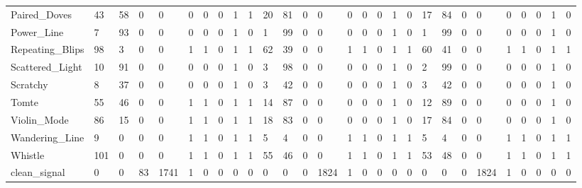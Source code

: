 \begin{tabular}{lllllrrlrrllllrrlllllllrrlll}
Paired_Doves & 43 & 58 & 0 & 0 & 0 & 0 & 0 & 1 & 1 & 20 & 81 & 0 & 0 & 0 & 0 & 0 & 1 & 0 & 17 & 84 & 0 & 0 & 0 & 0 & 0 & 1 & 0 \\
Power_Line & 7 & 93 & 0 & 0 & 0 & 0 & 0 & 1 & 0 & 1 & 99 & 0 & 0 & 0 & 0 & 0 & 1 & 0 & 1 & 99 & 0 & 0 & 0 & 0 & 0 & 1 & 0 \\
Repeating_Blips & 98 & 3 & 0 & 0 & 1 & 1 & 0 & 1 & 1 & 62 & 39 & 0 & 0 & 1 & 1 & 0 & 1 & 1 & 60 & 41 & 0 & 0 & 1 & 1 & 0 & 1 & 1 \\
Scattered_Light & 10 & 91 & 0 & 0 & 0 & 0 & 0 & 1 & 0 & 3 & 98 & 0 & 0 & 0 & 0 & 0 & 1 & 0 & 2 & 99 & 0 & 0 & 0 & 0 & 0 & 1 & 0 \\
Scratchy & 8 & 37 & 0 & 0 & 0 & 0 & 0 & 1 & 0 & 3 & 42 & 0 & 0 & 0 & 0 & 0 & 1 & 0 & 3 & 42 & 0 & 0 & 0 & 0 & 0 & 1 & 0 \\
Tomte & 55 & 46 & 0 & 0 & 1 & 1 & 0 & 1 & 1 & 14 & 87 & 0 & 0 & 0 & 0 & 0 & 1 & 0 & 12 & 89 & 0 & 0 & 0 & 0 & 0 & 1 & 0 \\
Violin_Mode & 86 & 15 & 0 & 0 & 1 & 1 & 0 & 1 & 1 & 18 & 83 & 0 & 0 & 0 & 0 & 0 & 1 & 0 & 17 & 84 & 0 & 0 & 0 & 0 & 0 & 1 & 0 \\
Wandering_Line & 9 & 0 & 0 & 0 & 1 & 1 & 0 & 1 & 1 & 5 & 4 & 0 & 0 & 1 & 1 & 0 & 1 & 1 & 5 & 4 & 0 & 0 & 1 & 1 & 0 & 1 & 1 \\
Whistle & 101 & 0 & 0 & 0 & 1 & 1 & 0 & 1 & 1 & 55 & 46 & 0 & 0 & 1 & 1 & 0 & 1 & 1 & 53 & 48 & 0 & 0 & 1 & 1 & 0 & 1 & 1 \\
clean_signal & 0 & 0 & 83 & 1741 & 1 & 0 & 0 & 0 & 0 & 0 & 0 & 0 & 1824 & 1 & 0 & 0 & 0 & 0 & 0 & 0 & 0 & 1824 & 1 & 0 & 0 & 0 & 0 \\
\bottomrule
\end{tabular}
